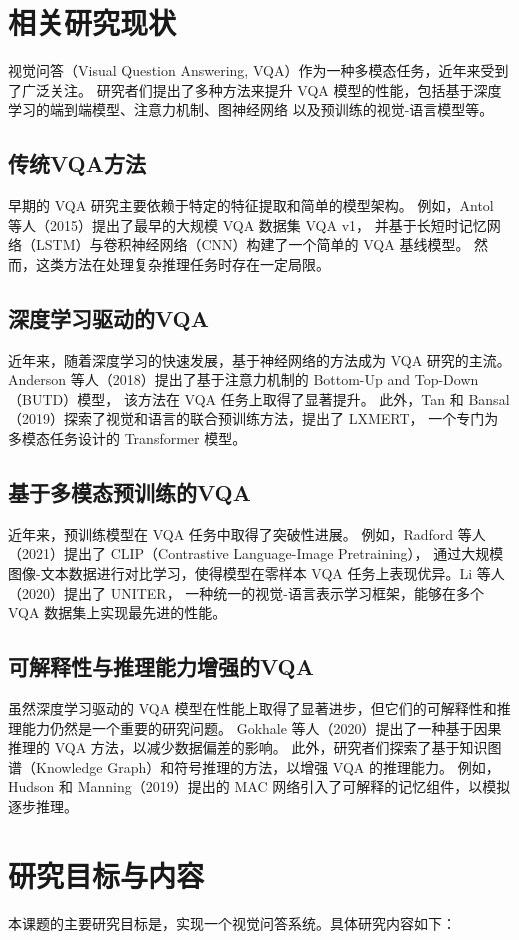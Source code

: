 \section{相关研究现状}
视觉问答（Visual Question Answering, VQA）作为一种多模态任务，近年来受到了广泛关注。
研究者们提出了多种方法来提升 VQA 模型的性能，包括基于深度学习的端到端模型、注意力机制、图神经网络
以及预训练的视觉-语言模型等。
\subsection{传统VQA方法}
早期的 VQA 研究主要依赖于特定的特征提取和简单的模型架构。
例如，Antol 等人（2015）提出了最早的大规模 VQA 数据集 VQA v1，
并基于长短时记忆网络（LSTM）与卷积神经网络（CNN）构建了一个简单的 VQA 基线模型\cite{Antol2015VQA}。
然而，这类方法在处理复杂推理任务时存在一定局限。
\subsection{深度学习驱动的VQA}
近年来，随着深度学习的快速发展，基于神经网络的方法成为 VQA 研究的主流。
Anderson 等人（2018）提出了基于注意力机制的 Bottom-Up and Top-Down（BUTD）模型，
该方法在 VQA 任务上取得了显著提升\cite{Anderson2018BUTD}。
此外，Tan 和 Bansal（2019）探索了视觉和语言的联合预训练方法，提出了 LXMERT，
一个专门为多模态任务设计的 Transformer 模型\cite{Tan2019LXMERT}。
\subsection{基于多模态预训练的VQA}
近年来，预训练模型在 VQA 任务中取得了突破性进展。
例如，Radford 等人（2021）提出了 CLIP（Contrastive Language-Image Pretraining），
通过大规模图像-文本数据进行对比学习，使得模型在零样本 VQA 任务上表现优异\cite{Radford2021CLIP}。Li 等人（2020）提出了 UNITER，
一种统一的视觉-语言表示学习框架，能够在多个 VQA 数据集上实现最先进的性能\cite{Li2020UNITER}。
\subsection{可解释性与推理能力增强的VQA}
虽然深度学习驱动的 VQA 模型在性能上取得了显著进步，但它们的可解释性和推理能力仍然是一个重要的研究问题。
Gokhale 等人（2020）提出了一种基于因果推理的 VQA 方法，以减少数据偏差的影响\cite{Gokhale2020CausalVQA}。
此外，研究者们探索了基于知识图谱（Knowledge Graph）和符号推理的方法，以增强 VQA 的推理能力。
例如，Hudson 和 Manning（2019）提出的 MAC 网络引入了可解释的记忆组件，以模拟逐步推理\cite{Hudson2019MAC}。

\section{研究目标与内容}
本课题的主要研究目标是，实现一个视觉问答系统。具体研究内容如下：

